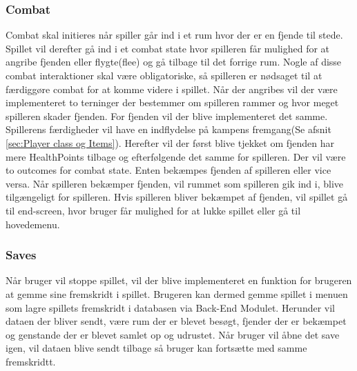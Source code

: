 \subsubsection{Combat}
\label{sec:Combat-design}
Combat skal initieres når spiller går ind i et rum hvor der er en fjende til stede. Spillet vil derefter gå ind i et combat state hvor spilleren får mulighed for at angribe fjenden eller flygte(flee) og gå tilbage til det forrige rum. Nogle af disse combat interaktioner skal være obligatoriske, så spilleren er nødsaget til at færdiggøre combat for at komme videre i spillet. Når der angribes vil der være implementeret to terninger der bestemmer om spilleren rammer og hvor meget spilleren skader fjenden. For fjenden vil der blive implementeret det samme. Spillerens færdigheder vil have en indflydelse på kampens fremgang(Se afsnit \autoref{sec:Player class og Items}). Herefter vil der først blive tjekket om fjenden har mere HealthPoints tilbage og efterfølgende det samme for spilleren. Der vil være to outcomes for combat state. Enten bekæmpes fjenden af spilleren eller vice versa. Når spilleren bekæmper fjenden, vil rummet som spilleren gik ind i, blive tilgængeligt for spilleren. Hvis spilleren bliver bekæmpet af fjenden, vil spillet gå til end-screen, hvor bruger får mulighed for at lukke spillet eller gå til hovedemenu.

\subsubsection{Saves}
Når bruger vil stoppe spillet, vil der blive implementeret en funktion for brugeren at gemme sine fremskridt i spillet. Brugeren kan dermed gemme spillet i menuen som lagre spillets fremskridt i databasen via Back-End Modulet. Herunder vil dataen der bliver sendt, være rum der er blevet besøgt, fjender der er bekæmpet og genstande der er blevet samlet op og udrustet. Når bruger vil åbne det save igen, vil dataen blive sendt tilbage så bruger kan fortsætte med samme fremskridtt.